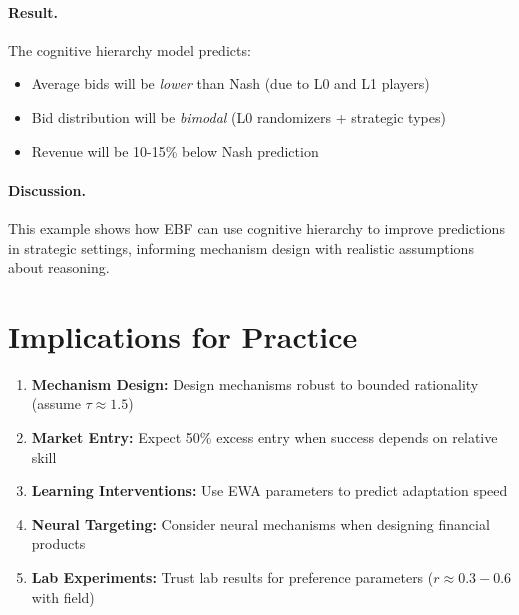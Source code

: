 \paragraph{Result.}
The cognitive hierarchy model predicts:
\begin{itemize}[nosep]
\item Average bids will be \textit{lower} than Nash (due to L0 and L1 players)
\item Bid distribution will be \textit{bimodal} (L0 randomizers + strategic types)
\item Revenue will be 10-15\% below Nash prediction
\end{itemize}

\paragraph{Discussion.}
This example shows how EBF can use cognitive hierarchy to improve predictions in strategic settings, informing mechanism design with realistic assumptions about reasoning.


\section{Implications for Practice}
\label{sec:ca-practice}

\begin{tcolorbox}[colback=green!5!white, colframe=green!75!black,
    title=Practical Implications]
\begin{enumerate}
\item \textbf{Mechanism Design:} Design mechanisms robust to bounded rationality (assume $\tau \approx 1.5$)
\item \textbf{Market Entry:} Expect 50\% excess entry when success depends on relative skill
\item \textbf{Learning Interventions:} Use EWA parameters to predict adaptation speed
\item \textbf{Neural Targeting:} Consider neural mechanisms when designing financial products
\item \textbf{Lab Experiments:} Trust lab results for preference parameters ($r \approx 0.3-0.6$ with field)
\end{enumerate}
\end{tcolorbox}


